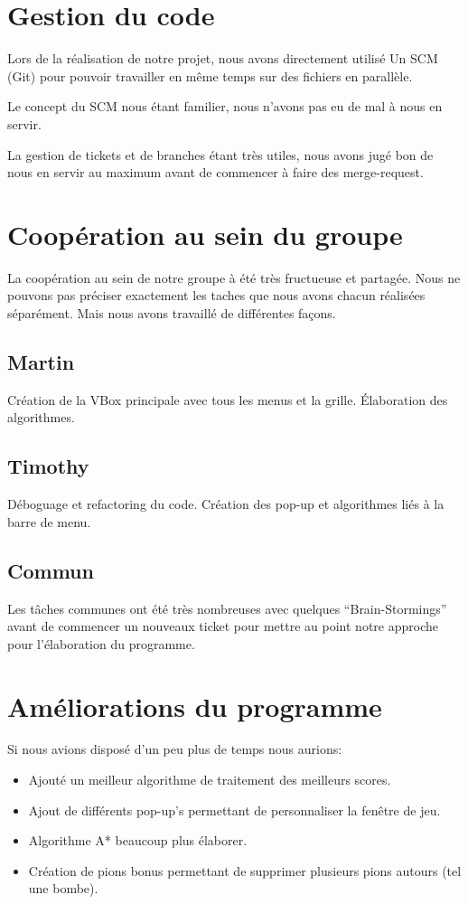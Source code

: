 \documentclass[a4paper, 11pt, oneside]{article}
\begin{document}
\newpage

\section{Gestion du code}
Lors de la réalisation de notre projet, nous avons directement utilisé Un SCM (Git) pour pouvoir travailler en même temps sur des fichiers en parallèle.\par
Le concept du SCM nous étant familier, nous n'avons pas eu de mal à nous en servir.\par
La gestion de tickets et de branches étant très utiles, nous avons jugé bon de nous en servir au maximum avant de commencer à faire des merge-request.

\section{Coopération au sein du groupe}
La coopération au sein de notre groupe à été très fructueuse et partagée. Nous ne pouvons pas préciser exactement les taches que nous avons chacun réalisées séparément. Mais nous avons travaillé de différentes façons.\par
\subsection{Martin}
Création de la VBox principale avec tous les menus et la grille.
Élaboration des algorithmes.
\subsection{Timothy}
Déboguage et refactoring du code.
Création des pop-up et algorithmes liés à la barre de menu.
\subsection{Commun}
Les tâches communes ont été très nombreuses avec quelques ``Brain-Stormings'' avant de commencer un nouveaux ticket pour mettre au point notre approche pour l'élaboration du programme.

\section{Améliorations du programme}
Si nous avions disposé d'un peu plus de temps nous aurions:\par
\begin{itemize}
    \item Ajouté un meilleur algorithme de traitement des meilleurs scores.
    \item Ajout de différents pop-up's permettant de personnaliser la fenêtre de jeu.
    \item Algorithme A* beaucoup plus élaborer.
    \item Création de pions bonus permettant de supprimer plusieurs pions autours (tel une bombe).
\end{itemize} 
\end{document}
